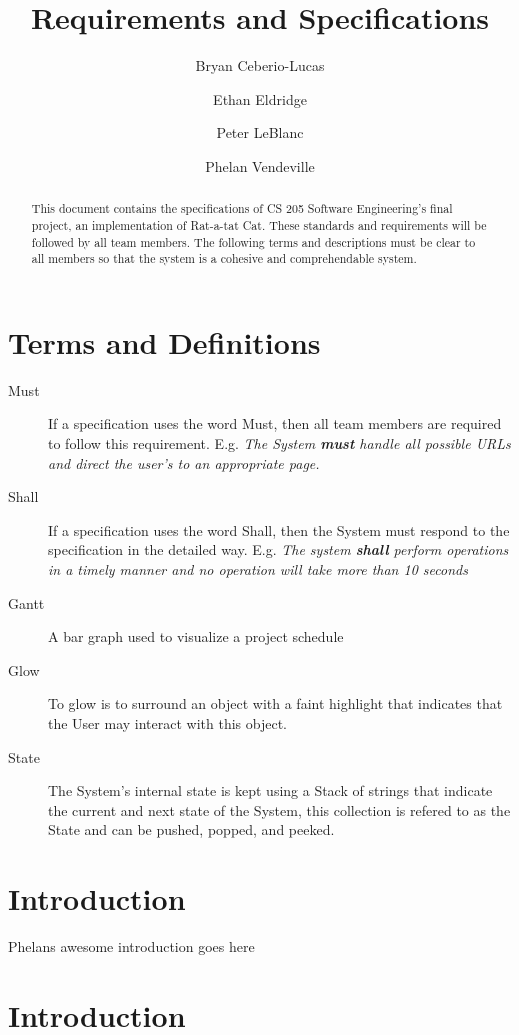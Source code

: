 \documentclass[12pt]{IEEEtran}
\title{Requirements and Specifications}
\author{Bryan Ceberio-Lucas \and Ethan Eldridge \and Peter LeBlanc \and Phelan Vendeville }
\begin{document}
\maketitle

\begin{abstract}
This document contains the specifications of CS 205 Software  Engineering's final project, an implementation of Rat-a-tat Cat. These standards and requirements will be followed by all team members. The following terms and descriptions must be clear to all members so that the system is a cohesive and comprehendable system.
\end{abstract}

\tableofcontents

\section{Terms and Definitions}
\label{sec:TermsDefinitions}
\begin{description}
	\item[Must] If a specification uses the word Must, then all team members are required to follow this requirement. E.g.  \textit{The System \textbf{must} handle all possible URLs and direct the user's to an appropriate page.} 
	\item[Shall] If a specification uses the word Shall, then the System must respond to the specification in the detailed way. E.g. \textit{The system \textbf{shall} perform operations in a timely manner and no operation will take more than 10 seconds}
	\item[Gantt] A bar graph used to visualize a project schedule
	\item[Glow] To glow is to surround an object with a faint highlight that indicates that the User may interact with this object.
	\item[State] The System's internal state is kept using a Stack of strings that indicate the current and next state of the System, this collection is refered to as the State and can be pushed, popped, and peeked.
\end{description}

\section{Introduction}

Phelans awesome introduction goes here

\section{Introduction}
\label{sec:introduction}
\end{document}
